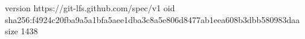 version https://git-lfs.github.com/spec/v1
oid sha256:f4924c20fba9a5a1bfa5aee1dba3c8a5e806d8477ab1eea608b3dbb580983daa
size 1438
